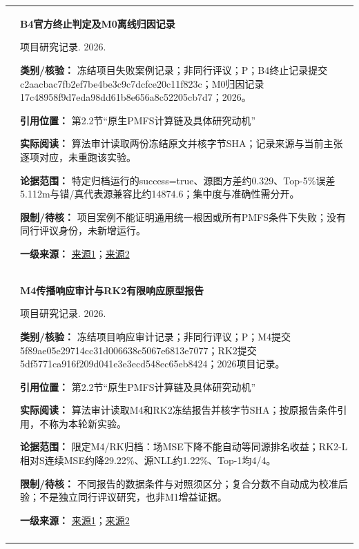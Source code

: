 \begin{longtable}{@{}>{\raggedright\arraybackslash}p{0.7cm}>{\raggedright\arraybackslash}p{14.8cm}@{}}
24 & \textbf{B4官方终止判定及M0离线归因记录}\par 项目研究记录. 2026. \par\textbf{类别/核验：} 冻结项目失败案例记录；非同行评议；P；B4终止记录提交c2aacbac7fb2ef7be4be3c9c7dcfce20c11f823c；M0归因记录17c48958f9d7eda98dd61b8e656a8c52205cb7d7；2026。\par\textbf{引用位置：} 第2.2节“原生PMFS计算链及具体研究动机”\par\textbf{实际阅读：} 算法审计读取两份冻结原文并核字节SHA；记录来源与当前主张逐项对应，未重跑该实验。\par\textbf{论据范围：} 特定归档运行的success=true、源图方差约0.329、Top-5\%误差5.112m与错/真代表源兼容比约14874.6；集中度与准确性需分开。\par\textbf{限制/待核：} 项目案例不能证明通用统一根因或所有PMFS条件下失败；没有同行评议身份，未新增运行。\par\textbf{一级来源：} \href{https://github.com/kris-yun/uav-gsl-isj/blob/c2aacbac7fb2ef7be4be3c9c7dcfce20c11f823c/research/pmfs_reproduction/b4_official_terminal_resumed_20261010/B4_OFFICIAL_TERMINAL_DECISION_zh.md}{来源1}；\href{https://github.com/kris-yun/uav-gsl-isj/blob/17c48958f9d7eda98dd61b8e656a8c52205cb7d7/research/pmfs_reproduction/b4_m0_offline_attribution_20261010/B4_M0_EVIDENCE_ATTRIBUTION_zh.md}{来源2} \\\addlinespace[6pt]
25 & \textbf{M4传播响应审计与RK2有限响应原型报告}\par 项目研究记录. 2026. \par\textbf{类别/核验：} 冻结项目响应审计记录；非同行评议；P；M4提交5f89ae05e29714cc31d006638c5067e6813e7077；RK2提交5df5771ca916f209d041e3e3ecd548ec65eb8424；2026项目记录。\par\textbf{引用位置：} 第2.2节“原生PMFS计算链及具体研究动机”\par\textbf{实际阅读：} 算法审计读取M4和RK2冻结报告并核字节SHA；按原报告条件引用，不称为本轮新实验。\par\textbf{论据范围：} 限定M4/RK归档：场MSE下降不能自动等同源排名收益；RK2-L相对S连续MSE约降29.22\%、源NLL约1.22\%、Top-1均4/4。\par\textbf{限制/待核：} 不同报告的数据条件与对照须区分；复合分数不自动成为校准后验；不是独立同行评议研究，也非M1增益证据。\par\textbf{一级来源：} \href{https://github.com/kris-yun/uav-gsl-isj/blob/5f89ae05e29714cc31d006638c5067e6813e7077/evidence/causal_compositional_plume_world_model_v1/M4_V2_FROZEN_TRANSPORT_RESPONSE_AUDIT_20260923.md}{来源1}；\href{https://github.com/kris-yun/uav-gsl-isj/blob/5df5771ca916f209d041e3e3ecd548ec65eb8424/research/pmfs_reproduction/PMFS_RK2_FINITE_RESPONSE_PROTOTYPE_20261010/RK2_FINITE_PROTOTYPE_REPORT_zh.md}{来源2} \\\addlinespace[6pt]

\end{longtable}
